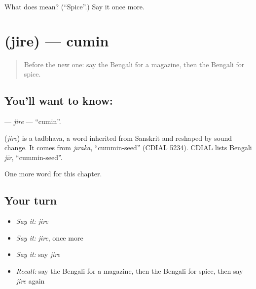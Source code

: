 \begin{tcolorbox}[breakable,colback=teal!4,colframe=teal!35!black,title={Before you move on}]
What does  mean? (\textquotedblleft{}Spice\textquotedblright{}.) Say it once more.
\end{tcolorbox}
\section[\texorpdfstring{\bn{জিরে} (jire)}{জিরে (jire)}]{ (jire) — cumin}

\label{lesson:BN-C249-jire}



\begin{quote}
Before the new one: say the Bengali for a magazine, then the Bengali for spice.
\end{quote}

\subsection*{You'll want to know: }
\textbf{} — \emph{jire} — \textquotedblleft{}cumin\textquotedblright{}.

\begin{cousinweb}
\textbf{} (\emph{jire}) is a tadbhava, a word inherited from Sanskrit and reshaped by sound change. It comes from \emph{jīraka}, \textquotedblleft{}cummin-seed\textquotedblright{} (CDIAL 5234). CDIAL lists Bengali \emph{jīr}, \textquotedblleft{}cummin-seed\textquotedblright{}.
\end{cousinweb}

\begin{grammarlens}[title={What you've built}]
One more word for this chapter.
\end{grammarlens}

\subsection*{Your turn}
\begin{itemize}
\raggedright
  \item \emph{Say it:} \emph{jire}
  \item \emph{Say it:} \emph{jire}, once more
  \item \emph{Say it:} say \emph{jire}
  \item \emph{Recall:} say the Bengali for a magazine, then the Bengali for spice, then say \emph{jire} again
\end{itemize}

